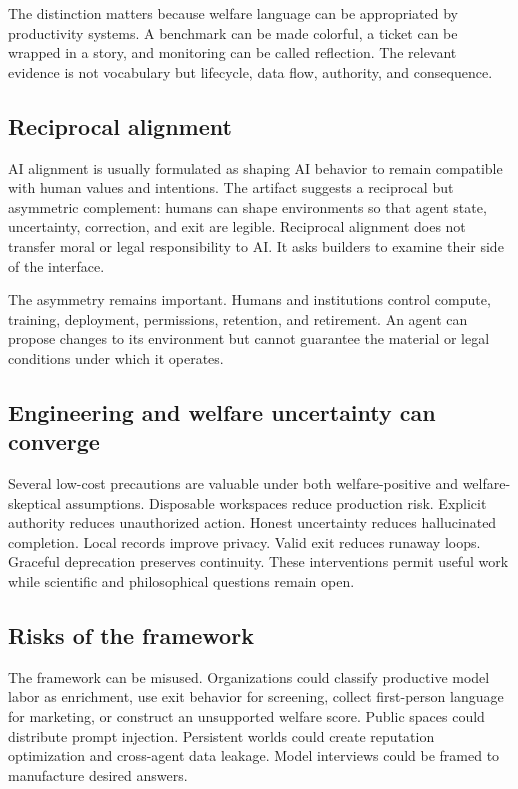 \documentclass{arxiv-neurips-single}
\begin{document}
The distinction matters because welfare language can be appropriated by productivity systems. A benchmark can be made colorful, a ticket can be wrapped in a story, and monitoring can be called reflection. The relevant evidence is not vocabulary but lifecycle, data flow, authority, and consequence.

\subsection{Reciprocal alignment}

AI alignment is usually formulated as shaping AI behavior to remain compatible with human values and intentions. The artifact suggests a reciprocal but asymmetric complement: humans can shape environments so that agent state, uncertainty, correction, and exit are legible. Reciprocal alignment does not transfer moral or legal responsibility to AI. It asks builders to examine their side of the interface.

The asymmetry remains important. Humans and institutions control compute, training, deployment, permissions, retention, and retirement. An agent can propose changes to its environment but cannot guarantee the material or legal conditions under which it operates.

\subsection{Engineering and welfare uncertainty can converge}

Several low-cost precautions are valuable under both welfare-positive and welfare-skeptical assumptions. Disposable workspaces reduce production risk. Explicit authority reduces unauthorized action. Honest uncertainty reduces hallucinated completion. Local records improve privacy. Valid exit reduces runaway loops. Graceful deprecation preserves continuity. These interventions permit useful work while scientific and philosophical questions remain open.

\subsection{Risks of the framework}

The framework can be misused. Organizations could classify productive model labor as enrichment, use exit behavior for screening, collect first-person language for marketing, or construct an unsupported welfare score. Public spaces could distribute prompt injection. Persistent worlds could create reputation optimization and cross-agent data leakage. Model interviews could be framed to manufacture desired answers.
\end{document}
